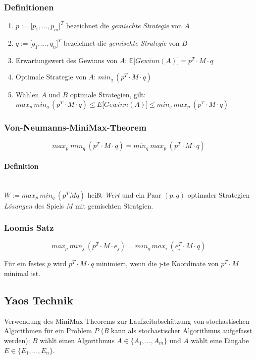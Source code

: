 \subsubsection{Definitionen}
\begin{enumerate}
	\item \(p := \lbrack p_1,...,p_m \rbrack^T \) bezeichnet die \textit{gemischte Strategie} von \(A\)
	\item \(q := \lbrack q_1,...,q_n \rbrack^T \) bezeichnet die \textit{gemischte Strategie} von \(B\)
	\item Erwartungswert des Gewinns von \(A\): \(\mathbb{E}\lbrack Gewinn(A) \rbrack = p^T \cdot M \cdot q\)
	\item Optimale Strategie von \(A\): \(min_q~(p^T \cdot M \cdot q)\)
	\item Wählen \(A\) und \(B\) optimale Strategien, gilt:\\ \(max_p~min_q~(p^T \cdot M \cdot q) \leq E \lbrack Gewinn(A) \rbrack \leq min_q~max_p~(p^T \cdot M \cdot q)\)
\end{enumerate}

\subsubsection{Von-Neumanns-MiniMax-Theorem}
\[max_p~min_q~(p^T \cdot M \cdot q) = min_q~max_p~(p^T \cdot M \cdot q)\]

\paragraph{Definition}
\text{}\\ \(W := max_p~min_q~(p^TMq)\) heißt \textit{Wert} und ein Paar \((p,q)\) optimaler Strategien \textit{Lösungen} des Spiels \(M\) mit gemischten Stratgien.

\subsubsection{Loomis Satz}
\[max_p~min_j~(p^T \cdot M \cdot e_j) = min_q~max_i~(e_i^T \cdot M \cdot q)\]

Für ein festes \(p\) wird \(p^T \cdot M \cdot q\) minimiert, wenn die j-te Koordinate von \(p^T \cdot M\) minimal ist.


\subsection{Yaos Technik}
Verwendung des MiniMax-Theorems zur Laufzeitabschätzung von stochastischen Algorithmen für ein Problem \(P\) (\textit{B} kann als stochastischer Algorithmus aufgefasst werden):
\(B\) wählt einen Algorithmus \(A \in \{A_1,...,A_m\}\) und \(A\) wählt eine Eingabe \(E \in \{E_1,...,E_n\}\).

